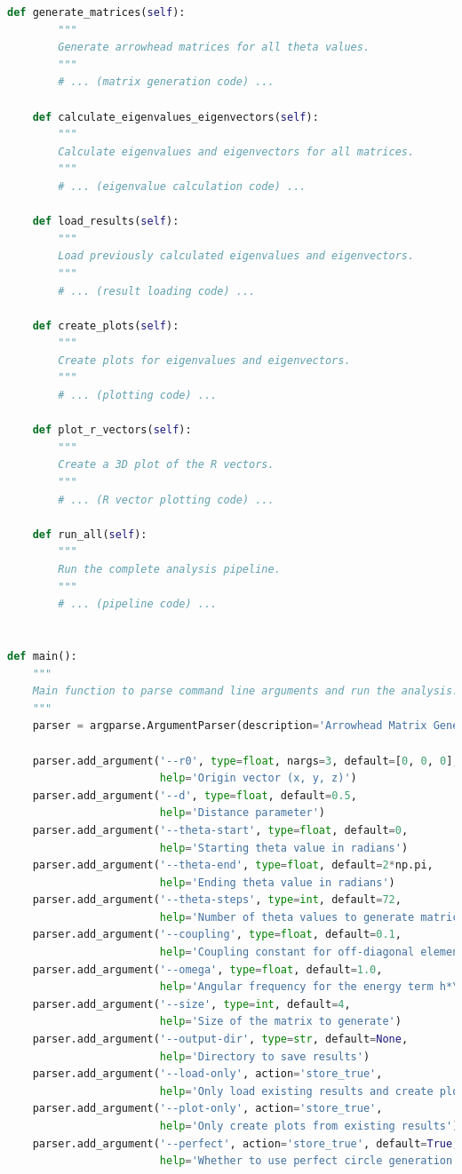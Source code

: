 \begin{lstlisting}[language=Python]
    def generate_matrices(self):
        """
        Generate arrowhead matrices for all theta values.
        """
        # ... (matrix generation code) ...
        
    def calculate_eigenvalues_eigenvectors(self):
        """
        Calculate eigenvalues and eigenvectors for all matrices.
        """
        # ... (eigenvalue calculation code) ...
        
    def load_results(self):
        """
        Load previously calculated eigenvalues and eigenvectors.
        """
        # ... (result loading code) ...
        
    def create_plots(self):
        """
        Create plots for eigenvalues and eigenvectors.
        """
        # ... (plotting code) ...
    
    def plot_r_vectors(self):
        """
        Create a 3D plot of the R vectors.
        """
        # ... (R vector plotting code) ...
    
    def run_all(self):
        """
        Run the complete analysis pipeline.
        """
        # ... (pipeline code) ...


def main():
    """
    Main function to parse command line arguments and run the analysis.
    """
    parser = argparse.ArgumentParser(description='Arrowhead Matrix Generator and Analyzer')
    
    parser.add_argument('--r0', type=float, nargs=3, default=[0, 0, 0],
                        help='Origin vector (x, y, z)')
    parser.add_argument('--d', type=float, default=0.5,
                        help='Distance parameter')
    parser.add_argument('--theta-start', type=float, default=0,
                        help='Starting theta value in radians')
    parser.add_argument('--theta-end', type=float, default=2*np.pi,
                        help='Ending theta value in radians')
    parser.add_argument('--theta-steps', type=int, default=72,
                        help='Number of theta values to generate matrices for')
    parser.add_argument('--coupling', type=float, default=0.1,
                        help='Coupling constant for off-diagonal elements')
    parser.add_argument('--omega', type=float, default=1.0,
                        help='Angular frequency for the energy term h*\omega')
    parser.add_argument('--size', type=int, default=4,
                        help='Size of the matrix to generate')
    parser.add_argument('--output-dir', type=str, default=None,
                        help='Directory to save results')
    parser.add_argument('--load-only', action='store_true',
                        help='Only load existing results and create plots')
    parser.add_argument('--plot-only', action='store_true',
                        help='Only create plots from existing results')
    parser.add_argument('--perfect', action='store_true', default=True,
                        help='Whether to use perfect circle generation method')
    

\end{lstlisting}

